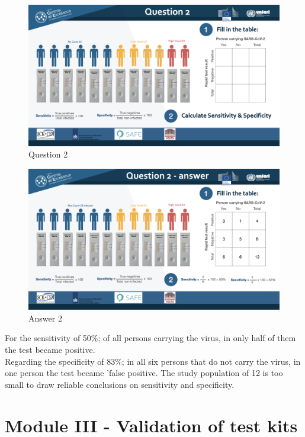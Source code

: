 \documentclass[
]{book}
\begin{document}
\begin{figure}
\centering
\includegraphics{images/m02/m02_questions_v2.004.jpeg}
\caption{Question 2}
\end{figure}

\begin{figure}
\centering
\includegraphics{images/m02/m02_questions_v2.005.jpeg}
\caption{Answer 2}
\end{figure}

For the sensitivity of 50\%; of all persons carrying the virus, in only half of them the test became positive.\\
Regarding the specificity of 83\%; in all six persons that do not carry the virus, in one person the test became 'false positive. The study population of 12 is too small to draw reliable conclusions on sensitivity and specificity.

\hypertarget{module-iii---validation-of-test-kits}{%
\section{Module III - Validation of test kits}\label{module-iii---validation-of-test-kits}}
\end{document}
